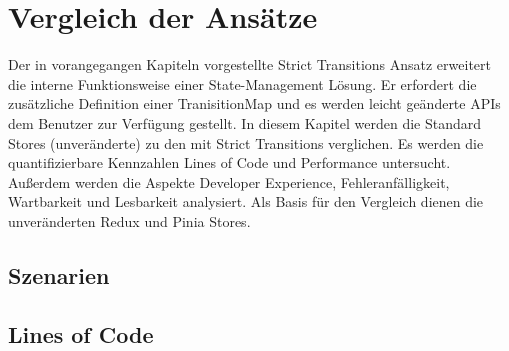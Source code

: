 \chapter{Vergleich der Ansätze} \label{vergleich}


Der in vorangegangen Kapiteln vorgestellte Strict Transitions Ansatz erweitert die interne Funktionsweise einer State-Management Lösung. Er erfordert die zusätzliche Definition einer TranisitionMap und es werden leicht geänderte APIs dem Benutzer zur Verfügung gestellt. In diesem Kapitel werden die Standard Stores (unveränderte) zu den mit Strict Transitions verglichen. Es werden die quantifizierbare Kennzahlen Lines of Code und Performance untersucht. Außerdem werden die Aspekte Developer Experience, Fehleranfälligkeit, Wartbarkeit und Lesbarkeit analysiert. Als Basis für den Vergleich dienen die unveränderten Redux und Pinia Stores.

\section{Szenarien}

%



\section{Lines of Code}

